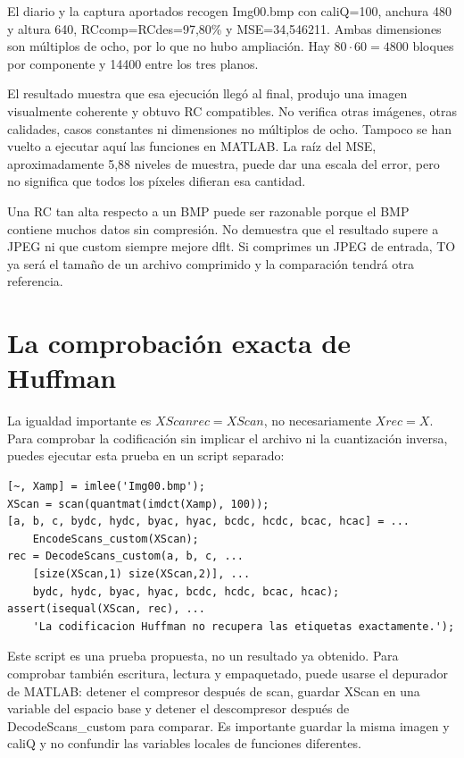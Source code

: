 \documentclass[11pt,a4paper,oneside]{report}
\begin{document}
El diario y la captura aportados recogen Img00.bmp con caliQ=100,
anchura 480 y altura 640, RCcomp=RCdes=97,80\% y MSE=34,546211.
Ambas dimensiones son múltiplos de ocho, por lo que no hubo ampliación.
Hay $80\cdot60=4800$ bloques por componente y 14400 entre los tres planos.

El resultado muestra que esa ejecución llegó al final, produjo una imagen
visualmente coherente y obtuvo RC compatibles. No verifica otras imágenes,
otras calidades, casos constantes ni dimensiones no múltiplos de ocho.
Tampoco se han vuelto a ejecutar aquí las funciones en MATLAB. La raíz del
MSE, aproximadamente 5,88 niveles de muestra, puede dar una escala del error,
pero no significa que todos los píxeles difieran esa cantidad.

Una RC tan alta respecto a un BMP puede ser razonable porque el BMP contiene
muchos datos sin compresión. No demuestra que el resultado supere a JPEG ni
que custom siempre mejore dflt. Si comprimes un JPEG de entrada, TO ya será
el tamaño de un archivo comprimido y la comparación tendrá otra referencia.


\section{La comprobación exacta de Huffman}

La igualdad importante es $XScanrec=XScan$, no necesariamente $Xrec=X$.
Para comprobar la codificación sin implicar el archivo ni la cuantización inversa,
puedes ejecutar esta prueba en un script separado:


\begin{lstlisting}
[~, Xamp] = imlee('Img00.bmp');
XScan = scan(quantmat(imdct(Xamp), 100));
[a, b, c, bydc, hydc, byac, hyac, bcdc, hcdc, bcac, hcac] = ...
    EncodeScans_custom(XScan);
rec = DecodeScans_custom(a, b, c, ...
    [size(XScan,1) size(XScan,2)], ...
    bydc, hydc, byac, hyac, bcdc, hcdc, bcac, hcac);
assert(isequal(XScan, rec), ...
    'La codificacion Huffman no recupera las etiquetas exactamente.');
\end{lstlisting}


Este script es una prueba propuesta, no un resultado ya obtenido. Para comprobar
también escritura, lectura y empaquetado, puede usarse el depurador de MATLAB:
detener el compresor después de scan, guardar XScan en una variable del espacio
base y detener el descompresor después de DecodeScans\_custom para comparar.
Es importante guardar la misma imagen y caliQ y no confundir las variables
locales de funciones diferentes.
\end{document}
